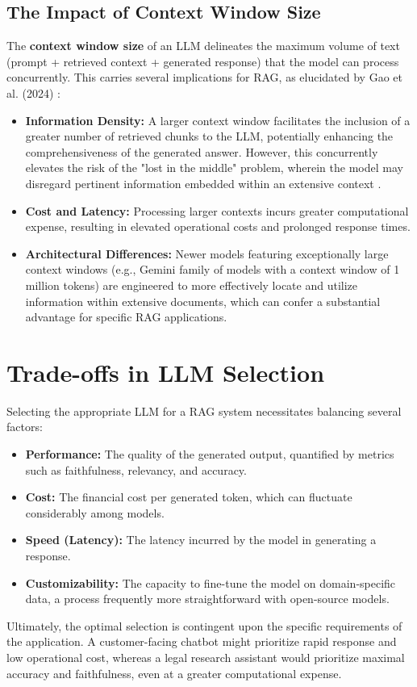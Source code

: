 \subsection{The Impact of Context Window Size}
The \textbf{context window size} of an LLM delineates the maximum volume of text (prompt + retrieved context + generated response) that the model can process concurrently. This carries several implications for RAG, as elucidated by Gao et al. (2024) \autocite{gao2024retrievalaugmentedgenerationlargelanguage}:
\begin{itemize}
    \item \textbf{Information Density:} A larger context window facilitates the inclusion of a greater number of retrieved chunks to the LLM, potentially enhancing the comprehensiveness of the generated answer. However, this concurrently elevates the risk of the "lost in the middle" problem, wherein the model may disregard pertinent information embedded within an extensive context \autocite{liu2023lostmiddlelanguagemodels}.
    \item \textbf{Cost and Latency:} Processing larger contexts incurs greater computational expense, resulting in elevated operational costs and prolonged response times.
    \item \textbf{Architectural Differences:} Newer models featuring exceptionally large context windows (e.g., Gemini family of models with a context window of 1 million tokens) are engineered to more effectively locate and utilize information within extensive documents, which can confer a substantial advantage for specific RAG applications.
\end{itemize}

\section{Trade-offs in LLM Selection}
Selecting the appropriate LLM for a RAG system necessitates balancing several factors:
\begin{itemize}
    \item \textbf{Performance:} The quality of the generated output, quantified by metrics such as faithfulness, relevancy, and accuracy.
    \item \textbf{Cost:} The financial cost per generated token, which can fluctuate considerably among models.
    \item \textbf{Speed (Latency):} The latency incurred by the model in generating a response.
    \item \textbf{Customizability:} The capacity to fine-tune the model on domain-specific data, a process frequently more straightforward with open-source models.
\end{itemize}

Ultimately, the optimal selection is contingent upon the specific requirements of the application. A customer-facing chatbot might prioritize rapid response and low operational cost, whereas a legal research assistant would prioritize maximal accuracy and faithfulness, even at a greater computational expense.
